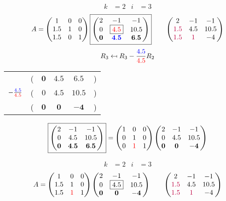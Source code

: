\documentclass[pdf]{beamer}
\begin{document}
\begin{frame}{}\begin{align*} k &= 2 & i &= 3 \end{align*} $$A=\begin{pmatrix}1&0&0\\1.5&1&0\\1.5&0&1\end{pmatrix} \boxed{\begin{pmatrix}2&-1&-1\\0&\boxed{{\color{red}4.5}}&10.5\\\mathbf{0}&\mathbf{{\color{blue}4.5}}&\mathbf{6.5}\end{pmatrix}} \quad\quad \begin{pmatrix}2&-1&-1\\{\color{purple}1.5}&4.5&10.5\\{\color{purple}1.5}&{\color{purple}1}&-4\end{pmatrix}$$ $$R_3 \mapsfrom R_3 - \frac{{\color{blue}4.5}}{{\color{red}4.5}} R_2$$ \begin{center}\begin{tabular}{cccccc}  &(& $ \mathbf{0} $ & $ \mathbf{4.5} $ & $ \mathbf{6.5} $ &)\\$ -\frac{{\color{blue}4.5}}{{\color{red}4.5}} $&(& $ 0 $ & $ 4.5 $ & $ 10.5 $ &)\\\hline  &(& $ \mathbf{0} $ & $ \mathbf{0} $ & $ \mathbf{-4} $ &) \end{tabular}\end{center} $$ \boxed{\begin{pmatrix}2&-1&-1\\0&4.5&10.5\\\mathbf{0}&\mathbf{4.5}&\mathbf{6.5}\end{pmatrix}} = \begin{pmatrix}1&0&0\\0&1&0\\0&{\color{red}1}&1\end{pmatrix} \begin{pmatrix}2&-1&-1\\0&4.5&10.5\\\mathbf{0}&\mathbf{0}&\mathbf{-4}\end{pmatrix} $$\end{frame}
\begin{frame}{}\begin{align*} k &= 2 & i &= 3 \end{align*}$$A=\begin{pmatrix}1&0&0\\1.5&1&0\\1.5&{\color{red}1}&1\end{pmatrix} \begin{pmatrix}2&-1&-1\\0&\boxed{4.5}&10.5\\\mathbf{0}&\mathbf{0}&\mathbf{-4}\end{pmatrix} \quad\quad \begin{pmatrix}2&-1&-1\\{\color{purple}1.5}&4.5&10.5\\{\color{purple}1.5}&{\color{purple}1}&-4\end{pmatrix}$$\end{frame}
\end{document}
